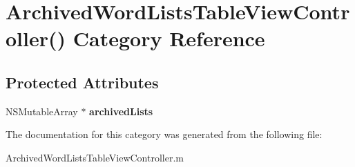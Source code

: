 \hypertarget{category_archived_word_lists_table_view_controller_07_08}{\section{Archived\+Word\+Lists\+Table\+View\+Controller() Category Reference}
\label{category_archived_word_lists_table_view_controller_07_08}
}
\subsection*{Protected Attributes}
\begin{DoxyCompactItemize}
\item 
\hypertarget{category_archived_word_lists_table_view_controller_07_08_ade338f8f3f6181e49b23845f5cc6434e}{N\+S\+Mutable\+Array $\ast$ {\bfseries archived\+Lists}}\label{category_archived_word_lists_table_view_controller_07_08_ade338f8f3f6181e49b23845f5cc6434e}

\end{DoxyCompactItemize}


The documentation for this category was generated from the following file\+:\begin{DoxyCompactItemize}
\item 
Archived\+Word\+Lists\+Table\+View\+Controller.\+m\end{DoxyCompactItemize}
